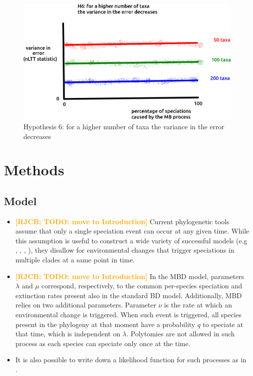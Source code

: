 \documentclass{article}
\newcommand*\richel[1]{\textcolor{orange}{\textbf{[RJCB: #1]}}}
\begin{document}
\begin{itemize}
\begin{figure}[!htbp]
  \includegraphics[width=\textwidth]{fig_h_6.png}
  \caption{
    Hypothesis 6: for a higher number of taxa 
    the variance in the error decreases
  }
  \label{fig_h_6}
\end{figure}

\end{itemize}

\section{Methods}

\subsection{Model}
\begin{itemize}

\item 
\richel{TODO: move to Introduction}
Current phylogenetic tools assume that only a single speciation event 
can occur at any given time.
While this assumption is useful to construct a wide variety of successful 
models (e.g \cite{Maddison2007biSSE}, \cite{Valente2015}, 
\cite{etienne2012diversity}, \cite{etienne2014estimating}),
they disallow for environmental changes that trigger speciations 
in multiple clades at a same point in time. 

\item 
\richel{TODO: move to Introduction}
In the MBD model, parameters $\lambda$ and $\mu$ correspond, respectively, 
to the common per-species speciation and extinction rates present 
also in the standard BD model. 
Additionally, MBD relies on two additional parameters. 
Parameter $\nu$ is the rate at which an environmental change is triggered.
When such event is triggered, 
all species present in the phylogeny at that moment
have a probability $q$ to speciate at that time, which is 
independent on $\lambda$. 
Polytomies are not allowed in such process 
as each species can speciate only once at the time.

\item It is also possible to write down a likelihood function 
for such processes as in \cite{mbd}.
    
\end{itemize}
\end{document}
